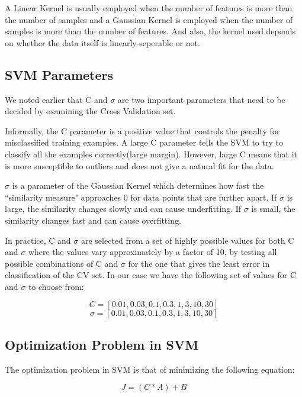 \documentclass{acm_proc_article-sp}
\begin{document}
A Linear Kernel is usually employed when the number of features is more than the number of samples and a Gaussian Kernel is employed when the number of samples is more than the number of features. And also, the kernel used depends on whether the data itself is linearly-seperable or not.

\subsection{SVM Parameters}

We noted earlier that C and $\sigma$ are two important parameters that need to be decided by examining the Cross Validation set.

Informally, the C parameter is a positive value that controls the penalty for misclassified training examples. A large C parameter tells the SVM to try to classify all the examples correctly(large margin). However, large C means that it is more susceptible to outliers and does not give a natural fit for the data.

$\sigma$ is a parameter of the Gaussian Kernel which determines how fast the ``similarity measure" approaches 0 for data points that are further apart. If $\sigma$ is large, the similarity changes slowly and can cause underfitting. If $\sigma$ is small, the similarity changes fast and can cause overfitting.

In practice, C and $\sigma$ are selected from a set of highly possible values for both C and $\sigma$ where the values vary approximately by a factor of 10, by testing all possible combinations of C and $\sigma$ for the one that gives the least error in classification of the CV set. In our case we have the following set of values for C and $\sigma$ to choose from:

\begin{equation}C = [0.01, 0.03, 0.1, 0.3, 1, 3, 10, 30]\end{equation}
\begin{equation}\sigma = [0.01, 0.03, 0.1, 0.3, 1, 3, 10, 30]\end{equation}

\subsection{Optimization Problem in SVM}

The optimization problem in SVM is that of minimizing the following equation:

\begin{equation}J = (C * A) + B\end{equation}
\end{document}
